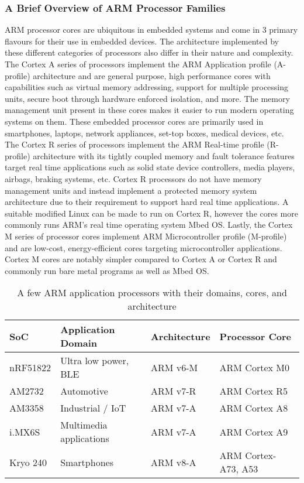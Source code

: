 \subsubsection{A Brief Overview of ARM Processor Families}

ARM processor cores are ubiquitous in embedded systems and come in 3 primary flavours for their use in embedded devices. The architecture implemented by these different categories of processors also differ in their nature and complexity. The Cortex A series of processors implement the ARM Application profile (A-profile) architecture and are general purpose, high performance cores with capabilities such as virtual memory addressing, support for multiple processing units, secure boot through hardware enforced isolation, and more. The memory management unit present in these cores makes it easier to run modern operating systems on them. These embedded processor cores are primarily used in smartphones, laptops, network appliances, set-top boxes, medical devices, etc. The Cortex R series of processors implement the ARM Real-time profile (R-profile) architecture with its tightly coupled memory and fault tolerance features target real time applications such as solid state device controllers, media players, airbags, braking systems, etc. Cortex R processors do not have memory management units and instead implement a protected memory system architecture due to their requirement to support hard real time applications. A suitable modified Linux can be made to run on Cortex R, however the cores more commonly runs ARM's real time operating system Mbed OS. Lastly, the Cortex M series of processor cores implement ARM Microcontroller profile (M-profile) and are low-cost, energy-efficient cores targeting microcontroller applications. Cortex M cores are notably simpler compared to Cortex A or Cortex R and commonly run bare metal programs as well as Mbed OS.

\begin{table}[h]
	\centering
	\begin{tabular}{ |p{5em}|p{10em}|p{7em}|p{10em}| }
		\hline
			\textbf{SoC} &
			\textbf{Application Domain} &
			\textbf{Architecture} &
			\textbf{Processor Core} \\
		\hline
			nRF51822 &
			Ultra low power, BLE &
			ARM v6-M &
			ARM Cortex M0 \\
		\hline
			AM2732 &
			Automotive &
			ARM v7-R &
			ARM Cortex R5 \\
		\hline
			AM3358 &
			Industrial / IoT &
			ARM v7-A &
			ARM Cortex A8 \\
		\hline
			i.MX6S &
			Multimedia applications &
			ARM v7-A &
			ARM Cortex A9 \\
		\hline
			Kryo 240 &
			Smartphones &
			ARM v8-A &
			ARM Cortex-A73, A53 \\
		\hline
	\end{tabular}
	\caption{A few ARM application processors with their domains, cores, and architecture}
	\label{table:arm}
\end{table}

